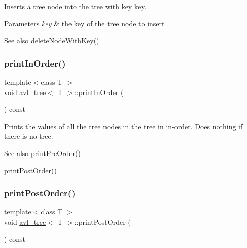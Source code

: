 Inserts a tree node into the tree with key key. 
\begin{DoxyParams}{Parameters}
{\em key} & the key of the tree node to insert \\
\hline
\end{DoxyParams}
\begin{DoxySeeAlso}{See also}
\hyperlink{classavl__tree_a2ed74e7f2e93edea90c5867ec127086f}{delete\+Node\+With\+Key()} 
\end{DoxySeeAlso}
\mbox{\label{classavl__tree_a524ae6ac5d7f7c2399fb758aba84af80}} 
\subsubsection{\texorpdfstring{print\+In\+Order()}{printInOrder()}}
{\footnotesize\ttfamily template$<$class T $>$ \\
void \hyperlink{classavl__tree}{avl\+\_\+tree}$<$ T $>$\+::print\+In\+Order (\begin{DoxyParamCaption}{ }\end{DoxyParamCaption}) const\hspace{0.3cm}{\ttfamily [inline]}}

Prints the values of all the tree nodes in the tree in in-\/order. Does nothing if there is no tree. \begin{DoxySeeAlso}{See also}
\hyperlink{classavl__tree_ac17fa1e4aa2f0f4b609a7b72c34bd2f6}{print\+Pre\+Order()} 

\hyperlink{classavl__tree_a5fb83061648947aeb6b540a5dee7ae13}{print\+Post\+Order()} 
\end{DoxySeeAlso}
\mbox{\label{classavl__tree_a5fb83061648947aeb6b540a5dee7ae13}} 
\subsubsection{\texorpdfstring{print\+Post\+Order()}{printPostOrder()}}
{\footnotesize\ttfamily template$<$class T $>$ \\
void \hyperlink{classavl__tree}{avl\+\_\+tree}$<$ T $>$\+::print\+Post\+Order (\begin{DoxyParamCaption}{ }\end{DoxyParamCaption}) const\hspace{0.3cm}{\ttfamily [inline]}}

